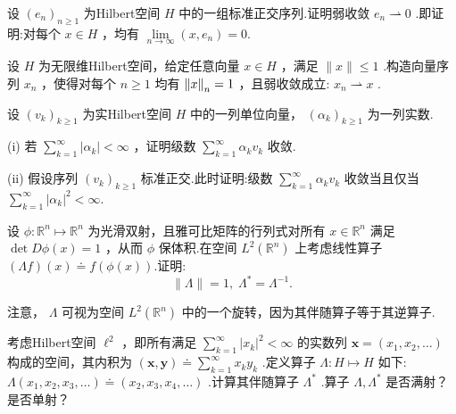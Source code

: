 \begin{rbhw}
设 ${\left( {e}_{n}\right) }_{n \geq  1}$ 为Hilbert空间 $H$ 中的一组标准正交序列.证明弱收敛 ${e}_{n} \rightharpoonup  0$ .即证明:对每个 $x \in  H$ ，均有 $\mathop{\lim }\limits_{{n \rightarrow  \infty }}\left( {x,{e}_{n}}\right)  = 0.$
\end{rbhw}

\begin{rbhw}
设 $H$ 为无限维Hilbert空间，给定任意向量 $x \in  H$ ，满足 $\| x\|  \leq  1$ .构造向量序列 ${x}_{n}$ ，使得对每个 $n \geq  1$ 均有 $\norm{x}_{n} = 1$ ，且弱收敛成立: ${x}_{n} \rightharpoonup  x$ .
\end{rbhw}

\begin{rbhw}
设 ${\left( {v}_{k}\right) }_{k \geq  1}$ 为实Hilbert空间 $H$ 中的一列单位向量， ${\left( {\alpha }_{k}\right) }_{k \geq  1}$ 为一列实数.

(i) 若 $\sum\limits_{{k = 1}}^{\infty }\left| {\alpha }_{k}\right|  < \infty$ ，证明级数 $\sum\limits_{{k = 1}}^{\infty }{\alpha }_{k}{v}_{k}$ 收敛.

(ii) 假设序列 ${\left( {v}_{k}\right) }_{k \geq  1}$ 标准正交.此时证明:级数 $\sum\limits_{{k = 1}}^{\infty }{\alpha }_{k}{v}_{k}$ 收敛当且仅当 $\sum\limits_{{k = 1}}^{\infty }{\left| {\alpha }_{k}\right| }^{2} < \infty$.
\end{rbhw}

\begin{rbhw}
设 $\phi  : {\mathbb{R}}^{n} \mapsto  {\mathbb{R}}^{n}$ 为光滑双射，且雅可比矩阵的行列式对所有 $x \in  {\mathbb{R}}^{n}$ 满足 $\det {D\phi }\left( x\right)  = 1$ ，从而 $\phi$ 保体积.在空间 ${L}^{2}\left( {\mathbb{R}}^{n}\right)$ 上考虑线性算子 $\left( {\Lambda f}\right) \left( x\right)  \doteq  f\left( {\phi \left( x\right) }\right)$.证明:
\[
\| \Lambda \|  = 1,\;{\Lambda }^{ * } = {\Lambda }^{-1}.
\]

注意， $\Lambda$ 可视为空间 ${L}^{2}\left( {\mathbb{R}}^{n}\right)$ 中的一个旋转，因为其伴随算子等于其逆算子.
\end{rbhw}

\begin{rbhw}
考虑Hilbert空间 ${\ell }^{2}$ ，即所有满足 $\sum\limits_{{k = 1}}^{\infty }{\left| {x}_{k}\right| }^{2} < \infty$ 的实数列 $\bm{x} = \left( {{x}_{1},{x}_{2},\ldots }\right)$ 构成的空间，其内积为 $\left( {\bm{x},\bm{y}}\right)  \doteq  \sum\limits_{{k = 1}}^{\infty }{x}_{k}{y}_{k}$ .定义算子 $\Lambda  : H \mapsto  H$ 如下: $\Lambda \left( {{x}_{1},{x}_{2},{x}_{3},\ldots }\right)  \doteq  \left( {{x}_{2},{x}_{3},{x}_{4},\ldots }\right)$ .计算其伴随算子 ${\Lambda }^{ * }$ .算子 $\Lambda ,{\Lambda }^{ * }$ 是否满射？是否单射？
\end{rbhw}

